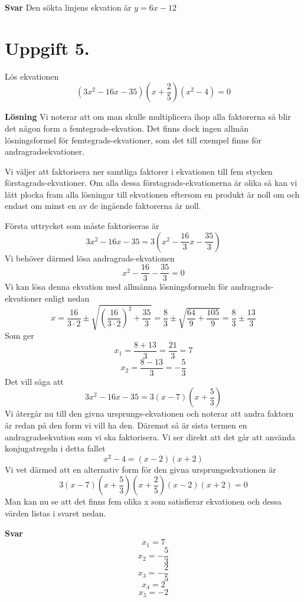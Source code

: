 \documentclass[fleqn]{article}
\begin{document}
\textbf{Svar}
Den sökta linjens ekvation är $y = 6x - 12$
 
\newpage
\section*{Uppgift 5.}

Lös ekvationen
\[
(3x^2 - 16x - 35)(x + \dfrac{2}{5})(x^2-4)=0
\]

\textbf{Lösning}
Vi noterar att om man skulle multiplicera ihop alla faktorerna så blir det någon form a femtegrads-ekvation. Det finns dock ingen allmän lösningsformel för femtegrads-ekvationer, som det till exempel finns för andragradsekvationer.

Vi väljer att faktorisera ner samtliga faktorer i ekvationen till fem stycken förstagrads-ekvationer. Om alla dessa förstagrads-ekvationerna är olika så kan vi lätt plocka fram alla lösningar till ekvationen eftersom en produkt är noll om och endast om minst en av de ingående faktorerna är noll.

Första uttrycket som måste faktoriseras är 
\[
3x^2 - 16x - 35 = 3(x^2 - \dfrac{16}{3}x - \dfrac{35}{3})
\]
Vi behöver därmed lösa andragrads-ekvationen
\[
x^2 - \dfrac{16}{3} - \dfrac{35}{3} = 0 
\]
Vi kan lösa denna ekvation med allmänna lösningsformeln för andragrads-ekvationer enligt nedan
\[
x = \dfrac{16}{3 \cdot 2} \pm \sqrt{\left(\dfrac{16}{3 \cdot 2}\right) ^2+\dfrac{35}{3}} 
= \dfrac{8}{3} \pm \sqrt{\dfrac{64}{9}+\dfrac{105}{9}}
= \dfrac{8}{3} \pm \dfrac{13}{3}
\]
Som ger
\[
x_1 = \dfrac{8+13}{3} = \dfrac{21}{3} = 7
\]
\[
x_2 = \dfrac{8-13}{3} = -\dfrac{5}{3}
\]
Det vill säga att
\[
3x^2 - 16x - 35 = 3(x - 7)(x + \dfrac{5}{3})
\]
Vi återgår nu till den givna ursprungs-ekvationen och noterar att andra faktorn är redan på den form vi vill ha den. Däremot så är sista termen en andragradsekvation som vi ska faktorisera. Vi ser direkt att det går att använda konjugatregeln i detta fallet
\[
x^2 - 4=(x-2)(x+2)
\]
Vi vet därmed att en alternativ form för den givna ursprungsekvationen är
\[
3(x-7)(x + \dfrac{5}{3})(x + \dfrac{2}{5})(x - 2)(x + 2) = 0
\]
Man kan nu se att det finns fem olika x som satisfierar ekvationen och dessa värden listas i svaret nedan.

\textbf{Svar}
\[
x_1 = 7 
\]
\[
x_2 = -\dfrac{5}{3} 
\]
\[
x_3 = -\dfrac{2}{5} 
\]
\[
x_4 = 2
\]
\[
x_5 = -2
\]
\end{document}
